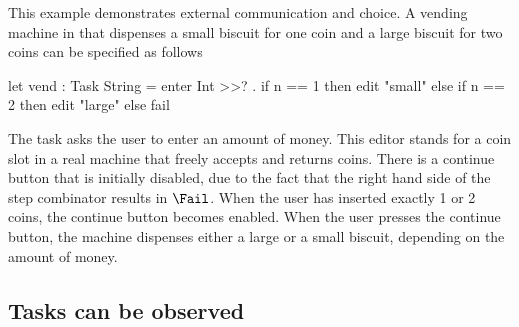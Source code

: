 \begin{example}
\label{Vending machine}

This example demonstrates external communication and choice.
A vending machine in \TOPHAT that dispenses a small biscuit for one coin and a large biscuit for two coins can be specified as follows
\begin{TASK}
  let vend : Task String = enter Int >>? \n. if n == 1 then edit "small"
                                                       else if n == 2 then edit "large"
                                                                      else fail
\end{TASK}
The task asks the user to enter an amount of money.
This editor stands for a coin slot in a real machine that freely accepts and returns coins.
There is a continue button that is initially disabled, due to the fact that the right hand side of the step combinator results in $\Fail$.
When the user has inserted exactly 1 or 2 coins, the continue button becomes enabled.
When the user presses the continue button, the machine dispenses either a large or a small biscuit, depending on the amount of money.

\end{example}



\subsection{Tasks can be observed}

